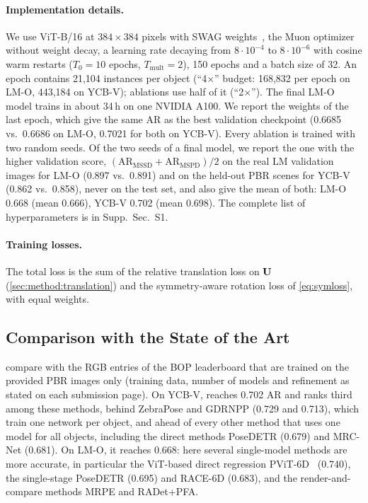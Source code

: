 \paragraph{Implementation details.}
We use ViT-B/16 at $384 \times 384$ pixels with SWAG weights~\cite{singh2022swag}, the Muon
optimizer~\cite{jordan2024muon} without weight decay, a learning rate decaying from
$8 \cdot 10^{-4}$ to $8 \cdot 10^{-6}$ with cosine warm restarts ($T_0 = 10$ epochs,
$T_\mathrm{mult} = 2$), 150 epochs and a batch size of 32. An epoch contains 21,104 instances per object (``4$\times$''
budget: 168,832 per epoch on LM-O, 443,184 on YCB-V); ablations use half of it (``2$\times$'').
The final LM-O model trains in about 34\,h on one NVIDIA A100. We report the weights of the last
epoch, which give the same AR as the best validation checkpoint (0.6685 vs.\ 0.6686 on LM-O,
0.7021 for both on YCB-V). Every ablation is trained with two random seeds. Of the two seeds of
a final model, we report the one with the higher validation score, $(\mathrm{AR}_\mathrm{MSSD} +
\mathrm{AR}_\mathrm{MSPD})/2$ on the real LM validation images for LM-O (0.897 vs.\ 0.891) and on
the held-out PBR scenes for YCB-V (0.862 vs.\ 0.858), never on the test set, and also give the
mean of both: LM-O 0.668 (mean 0.666), YCB-V 0.702 (mean 0.698). The complete list of
hyperparameters is in Supp.~Sec.~S1.

\paragraph{Training losses.}
The total loss is the sum of the relative translation loss on $\mathbf{U}$ (\cref{sec:method:translation})
and the symmetry-aware rotation loss of \cref{eq:symloss}, with equal weights.

\subsection{Comparison with the State of the Art}
\label{sec:exp:sota}

 compare \ours{} with the RGB entries of the BOP leaderboard that are
trained on the provided PBR images only (training data, number of models and refinement as stated
on each submission page). On YCB-V, \ours{} reaches 0.702 AR and ranks third among these methods,
behind ZebraPose and GDRNPP (0.729 and 0.713), which train one network per object, and ahead of
every other method that uses one model for all objects, including the direct methods PoseDETR
(0.679) and MRC-Net (0.681). On LM-O, it reaches 0.668: here several single-model methods are more
accurate, in particular the ViT-based direct regression PViT-6D~\cite{stapf2023pvit6d} (0.740),
the single-stage PoseDETR (0.695) and RACE-6D (0.683), and the render-and-compare methods MRPE and
RADet+PFA. 

